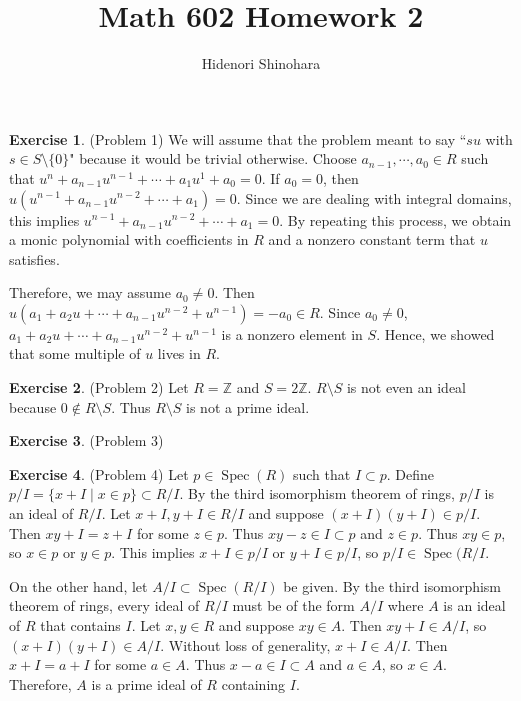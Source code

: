 \documentclass[12pt, psamsfonts]{amsart}
\theoremstyle{definition}
\newtheorem*{exer}{Exercise}
\theoremstyle{remark}
\DeclareMathOperator{\Spec}{Spec}
\numberwithin{equation}{section}
\begin{document}
\title{Math 602 Homework 2}
\author{Hidenori Shinohara}
\maketitle

\begin{exer}{(Problem 1)}
  We will assume that the problem meant to say ``$su$ with $s \in S \setminus \{ 0 \}$" because it would be trivial otherwise.
  Choose $a_{n - 1}, \cdots, a_0 \in R$ such that $u^n + a_{n - 1}u^{n - 1} + \cdots + a_1u^1 + a_0 = 0$.
  If $a_0 = 0$, then $u(u^{n - 1} + a_{n - 1}u^{n - 2} + \cdots + a_1) = 0$.
  Since we are dealing with integral domains, this implies $u^{n - 1} + a_{n - 1}u^{n - 2} + \cdots + a_1 = 0$.
  By repeating this process, we obtain a monic polynomial with coefficients in $R$ and a nonzero constant term that $u$ satisfies.

  Therefore, we may assume $a_0 \ne 0$.
  Then $u(a_1 + a_2u + \cdots + a_{n - 1}u^{n - 2} + u^{n - 1}) = -a_0 \in R$.
  Since $a_0 \ne 0$, $a_1 + a_2u + \cdots + a_{n - 1}u^{n - 2} + u^{n - 1}$ is a nonzero element in $S$.
  Hence, we showed that some multiple of $u$ lives in $R$.
\end{exer}

\begin{exer}{(Problem 2)}
  Let $R = \mathbb{Z}$ and $S = 2\mathbb{Z}$.
  $R \setminus S$ is not even an ideal because $0 \notin R \setminus S$.
  Thus $R \setminus S$ is not a prime ideal.
\end{exer}

\begin{exer}{(Problem 3)}
\end{exer}

\begin{exer}{(Problem 4)}
  Let $p \in \Spec(R)$ such that $I \subset p$.
  Define $p / I = \{ x + I \mid x \in p \} \subset R / I$.
  By the third isomorphism theorem of rings, $p / I$ is an ideal of $R / I$.
  Let $x + I, y + I \in R / I$ and suppose $(x + I)(y + I) \in p / I$.
  Then $xy + I = z + I$ for some $z \in p$.
  Thus $xy - z \in I \subset p$ and $z \in p$.
  Thus $xy \in p$, so $x \in p$ or $y \in p$.
  This implies $x + I \in p / I$ or $y + I \in p / I$, so $p / I \in \Spec(R / I$.

  On the other hand, let $A / I \subset \Spec(R / I)$ be given.
  By the third isomorphism theorem of rings, every ideal of $R / I$ must be of the form $A / I$ where $A$ is an ideal of $R$ that contains $I$.
  Let $x, y \in R$ and suppose $xy \in A$.
  Then $xy + I \in A / I$, so $(x + I)(y + I) \in A / I$.
  Without loss of generality, $x + I \in A / I$.
  Then $x + I = a + I$ for some $a \in A$.
  Thus $x - a \in I \subset A$ and $a \in A$, so $x \in A$.
  Therefore, $A$ is a prime ideal of $R$ containing $I$.
\end{exer}
\end{document}
